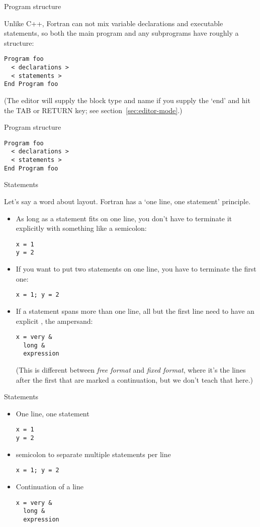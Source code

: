  {Program structure}

Unlike C++, Fortran can not mix variable declarations and executable
statements, so both the main program and any subprograms have roughly
a
structure:
\begin{verbatim}
Program foo
  < declarations >
  < statements >
End Program foo
\end{verbatim}
(The  editor will supply the block type and name if
you supply the `end' and hit the TAB or RETURN key; see
section~\ref{sec:editor-mode}.)

\begin{slide}{Program structure}
  \label{sl:programf}
\begin{verbatim}
Program foo
  < declarations >
  < statements >
End Program foo
\end{verbatim}
\end{slide}

 {Statements}

Let's say a word about layout. Fortran has a `one line, one statement'
principle.
\begin{itemize}
\item As long as a statement fits on one line, you don't have to
  terminate it explicitly with something like a semicolon:
\begin{verbatim}
x = 1
y = 2
\end{verbatim}
\item If you want to put two statements on one line, you have to
  terminate the first one:
\begin{verbatim}
x = 1; y = 2
\end{verbatim}
\item If a statement spans more than one line, all but the first line
  need to have an explicit , the ampersand:
\begin{verbatim}
x = very &
  long &
  expression
\end{verbatim}
(This is different between
\emph{free format}
and \emph{fixed format},
where it's the lines after the
first that are marked a continuation, but we don't teach that here.)
\end{itemize}

\begin{slide}{Statements}
  \label{sl:fstatement}
  \begin{itemize}
  \item One line, one statement
\begin{verbatim}
x = 1
y = 2
\end{verbatim}
\item semicolon to separate multiple statements per line
\begin{verbatim}
x = 1; y = 2
\end{verbatim}
\item Continuation of a line
\begin{verbatim}
x = very &
  long &
  expression
\end{verbatim}
  \end{itemize}
\end{slide}

